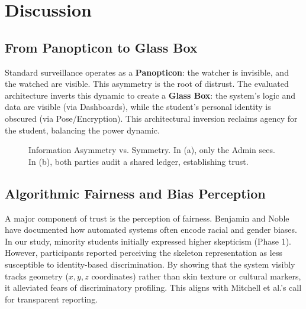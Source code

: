 \documentclass[conference]{IEEEtran}
\begin{document}
\section{Discussion}

\subsection{From Panopticon to Glass Box}
Standard surveillance operates as a \textbf{Panopticon}: the watcher is invisible, and the watched are visible. This asymmetry is the root of distrust.
The evaluated architecture inverts this dynamic to create a \textbf{Glass Box}: the system's logic and data are visible (via Dashboards), while the student's personal identity is obscured (via Pose/Encryption). This architectural inversion reclaims agency for the student, balancing the power dynamic.

\begin{figure}[htbp]
\centering
{}
\caption{Information Asymmetry vs. Symmetry. In (a), only the Admin sees. In (b), both parties audit a shared ledger, establishing trust.}
\label{fig:symmetry}
\end{figure}

\subsection{Algorithmic Fairness and Bias Perception}
A major component of trust is the perception of fairness. Benjamin \cite{b15} and Noble \cite{b16} have documented how automated systems often encode racial and gender biases. In our study, minority students initially expressed higher skepticism (Phase 1). However, participants reported perceiving the skeleton representation as less susceptible to identity-based discrimination. By showing that the system visibly tracks geometry ($x,y,z$ coordinates) rather than skin texture or cultural markers, it alleviated fears of discriminatory profiling. This aligns with Mitchell et al.'s \cite{b17} call for transparent reporting.
\end{document}
